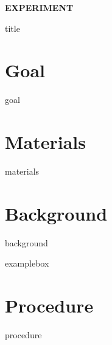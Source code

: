 \documentclass[cover.tex]{subfiles}
\begin{document}
 \begin{refsection}


\hfill\vspace{0.2cm}\begin{center}{\large \bfseries EXPERIMENT {\thesection}\par\Huge
 {title}
 \\[5pt] \par}\vspace{0.2cm}\end{center}\par\noindent
 
 
\section*{Goal}
 {goal}
 \section*{Materials}
 {materials}


 
\section*{Background}
 {background}


{examplebox}
\printbibliography[heading=subbibliography]
\section*{Procedure}
{procedure}

\clearpage\mbox{}\clearpage





\end{refsection}
\end{document}
